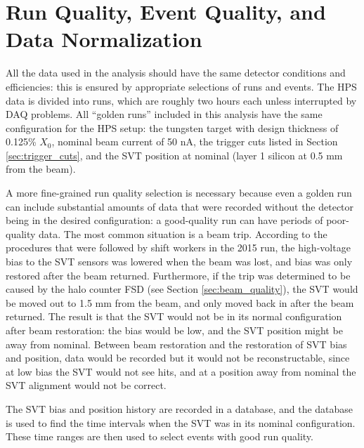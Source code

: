\section{Run Quality, Event Quality, and Data Normalization}
\label{sec:luminosity}
All the data used in the analysis should have the same detector conditions and efficiencies: this is ensured by appropriate selections of runs and events.
The HPS data is divided into runs, which are roughly two hours each unless interrupted by DAQ problems.
All ``golden runs'' included in this analysis have the same configuration for the HPS setup: the tungsten target with design thickness of 0.125\% $X_0$, nominal beam current of 50 nA, the trigger cuts listed in Section \ref{sec:trigger_cuts}, and the SVT position at nominal (layer 1 silicon at 0.5 mm from the beam).

A more fine-grained run quality selection is necessary because even a golden run can include substantial amounts of data that were recorded without the detector being in the desired configuration: a good-quality run can have periods of poor-quality data.
The most common situation is a beam trip.
According to the procedures that were followed by shift workers in the 2015 run, the high-voltage bias to the SVT sensors was lowered when the beam was lost, and bias was only restored after the beam returned.
Furthermore, if the trip was determined to be caused by the halo counter FSD (see Section \ref{sec:beam_quality}), the SVT would be moved out to 1.5 mm from the beam, and only moved back in after the beam returned.
The result is that the SVT would not be in its normal configuration after beam restoration: the bias would be low, and the SVT position might be away from nominal.
Between beam restoration and the restoration of SVT bias and position, data would be recorded but it would not be reconstructable, since at low bias the SVT would not see hits, and at a position away from nominal the SVT alignment would not be correct.

The SVT bias and position history are recorded in a database, and the database is used to find the time intervals when the SVT was in its nominal configuration.
These time ranges are then used to select events with good run quality.

